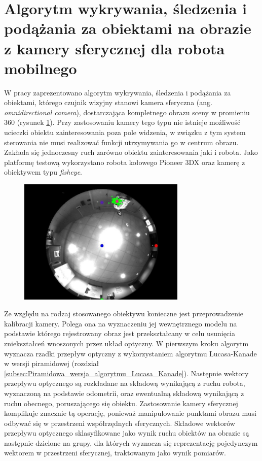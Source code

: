 {\section{Algorytm wykrywania, śledzenia i podążania za obiektami na obrazie z kamery sferycznej dla robota mobilnego}
\label{sec:Przyklad_Markovic2014}

W pracy \cite{Markovic2014} zaprezentowano algorytm wykrywania, śledzenia i podążania za obiektami, którego czujnik wizyjny stanowi kamera sferyczna (ang. \textit{omnidirectional camera}), dostarczająca kompletnego obrazu sceny w promieniu {360\textdegree} (rysunek \ref{fig:Kamera_sferyczna_Markovic}). Przy zastosowaniu kamery tego typu nie istnieje możliwość ucieczki obiektu zainteresowania poza pole widzenia, w związku z tym system sterowania nie musi realizować funkcji utrzymywania go w centrum obrazu. Zakłada się jednoczesny ruch zarówno obiektu zainteresowania jaki i robota. Jako platformę testową wykorzystano robota kołowego Pioneer 3DX oraz kamerę z obiektywem typu \textit{fisheye}.
\begin{figure}[!htb]
	\begin{center}
		\includegraphics[width=8cm]{images/omnidirectional_camera_markovic.png}
	\end{center}	
\label{fig:Kamera_sferyczna_Markovic}
\end{figure}

Ze względu na rodzaj stosowanego obiektywu konieczne jest przeprowadzenie kalibracji kamery. Polega ona na wyznaczeniu jej wewnętrznego modelu na podstawie którego rejestrowany obraz jest przekształcany w celu usunięcia zniekształceń wnoszonych przez układ optyczny. W pierwszym kroku algorytm wyznacza rzadki przepływ optyczny z wykorzystaniem algorytmu Lucasa-Kanade w wersji piramidowej (rozdział \ref{subsec:Piramidowa_wersja_algorytmu_Lucasa_Kanade}). Następnie wektory przepływu optycznego są rozkładane na składową wynikającą z ruchu robota, wyznaczoną na podstawie odometrii, oraz ewentualną składową wynikającą z ruchu obecnego, poruszającego się obiektu. Zastosowanie kamery sferycznej komplikuje znacznie tą operację, ponieważ manipulowanie punktami obrazu musi odbywać się w przestrzeni współrzędnych sferycznych. Składowe wektorów przepływu optycznego sklasyfikowane jako wynik ruchu obiektów na obrazie są następnie dzielone na grupy, dla których wyznacza się reprezentację pojedynczym wektorem w przestrzeni sferycznej, traktowanym jako wynik pomiarów.

}
